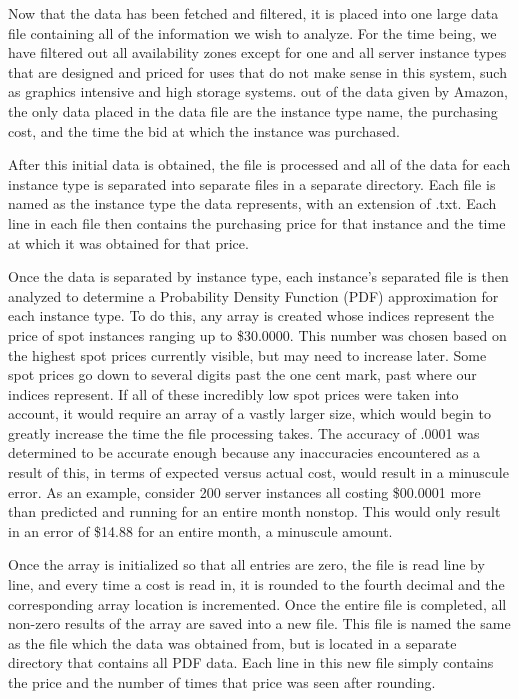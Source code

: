 \documentclass[thesis,proposal]{umassthesis}  %
\begin{document}
Now that the data has been fetched and filtered, it is placed into one large data file containing all of the information we wish to analyze. For the time being, we have filtered out all availability zones except for one and all server instance types that are designed and priced for uses that do not make sense in this system, such as graphics intensive and high storage systems. out of the data given by Amazon, the only data placed in the data file are the instance type name, the purchasing cost, and the time the bid at which the instance was purchased.\par 

After this initial data is obtained, the file is processed and all of the data for each instance type is separated into separate files in a separate directory. Each file is named as the instance type the data represents, with an extension of .txt. Each line in each file then contains the purchasing price for that instance and the time at which it was obtained for that price.\par

Once the data is separated by instance type, each instance's separated file is then analyzed to determine a Probability Density Function (PDF) approximation for each instance type. To do this, any array is created whose indices represent the price of spot instances ranging up to \$30.0000. This number was chosen based on the highest spot prices currently visible, but may need to increase later. Some spot prices go down to several digits past the one cent mark, past where our indices represent. If all of these incredibly low spot prices were taken into account, it would require an array of a vastly larger size, which would begin to greatly increase the time the file processing takes. The accuracy of .0001 was determined to be accurate enough because any inaccuracies encountered as a result of this, in terms of expected versus actual cost, would result in a minuscule error. As an example, consider 200 server instances all costing \$00.0001 more than predicted and running for an entire month nonstop. This would only result in an error of \$14.88 for an entire month, a minuscule amount.\par

Once the array is initialized so that all entries are zero, the file is read line by line, and every time a cost is read in, it is rounded to the fourth decimal and the corresponding array location is incremented. Once the entire file is completed, all non-zero results of the array are saved into a new file. This file is named the same as the file which the data was obtained from, but is located in a separate directory that contains all PDF data. Each line in this new file simply contains the price and the number of times that price was seen after rounding.\par
\end{document}
